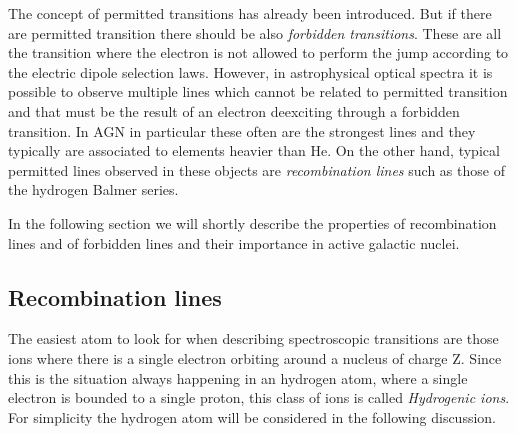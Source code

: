 \documentclass[../thesis.tex]{subfiles}
\begin{document}
The concept of permitted transitions has already been introduced.
But if there are permitted transition there should be also \emph{forbidden transitions}.
These are all the transition where the electron is not allowed to perform the jump according to the electric dipole selection laws.
However, in astrophysical optical spectra it is possible to observe multiple lines which cannot be related to permitted transition and that must be the result of an electron deexciting through a forbidden transition.
In AGN in particular these often are the strongest lines and they typically are associated to elements heavier than He.
On the other hand, typical permitted lines observed in these objects are \emph{recombination lines} such as those of the hydrogen Balmer series.

In the following section we will shortly describe the properties of recombination lines and of forbidden lines and their importance in active galactic nuclei.

\subsection{Recombination lines}

The easiest atom to look for when describing spectroscopic transitions are those ions where 
there is a single electron orbiting around a nucleus of charge Z.
Since this is the situation always happening in an hydrogen atom, where a single electron is bounded to a single proton, this class of ions is called \emph{Hydrogenic ions}.
For simplicity the hydrogen atom will be considered in the following discussion.
\end{document}
